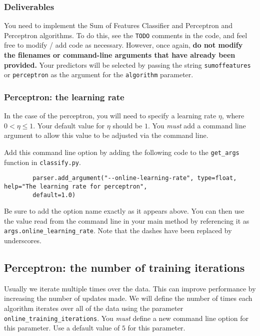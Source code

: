 \documentclass[11pt]{article}
\newcommand{\code}[1]{{\footnotesize \tt #1}}
\begin{document}
	\subsubsection{Deliverables}
	You need to implement the Sum of Features Classifier and Perceptron and Perceptron algorithms. To do this, see the \texttt{TODO} comments in the code, and feel free to modify / add code as necessary. However, once again, \textbf{do not modify the filenames or command-line arguments that have already been provided.} Your predictors will be selected by passing the string \texttt{sumoffeatures} or \texttt{perceptron} as the argument for the \texttt{algorithm} parameter.
	
	\subsubsection{Perceptron: the learning rate}
	In the case of the perceptron, you will need to specify a learning rate $\eta$, where  $0 < \eta \leq 1$.  Your default value for $\eta$ should be $1$. You \emph{must} add a command line argument to allow this value to be adjusted via the command line.
	
	Add this command line option by adding the following code to the \code{get\_args} function in \code{classify.py}.
	\begin{footnotesize}
		\begin{verbatim}
		parser.add_argument("--online-learning-rate", type=float, help="The learning rate for perceptron",
		default=1.0)
		\end{verbatim}
	\end{footnotesize}
	
	Be sure to add the option name exactly as it appears above. You can then use the value read from the command line in your main method by referencing it as \code{args.online\_learning\_rate}. Note that the dashes have been replaced by underscores.
	
	\subsection{Perceptron: the number of training iterations}
	Usually we iterate multiple times over the data. This can improve performance by increasing the number of updates made. We will define the number of times each algorithm iterates over all of the data using the parameter \code{online\_training\_iterations}. You \emph{must} define a new command line option for this parameter. Use a default value of $5$ for this parameter.
	
\end{document}
